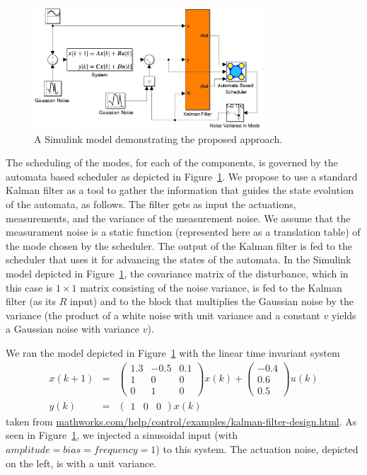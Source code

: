 \documentclass{sig-alternate-ipsn13}
\begin{document}
\begin{figure}%
	\centerline{\includegraphics[width=85mm]{SimulinkModel.jpg}}
	\caption{A Simulink model demonstrating the proposed approach.}
	\label{fig:simulink}
\end{figure}

The scheduling of the modes, for each of the components, is governed by the automata based scheduler as depicted in Figure~\ref{fig:simulink}. We propose to use a standard Kalman filter as a tool to gather the information that guides the state evolution of the automata, as follows. The filter gets as input the actuations,  measurements, and the variance of the measurement noise. We assume that the measurament noise is a static function (represented here as a translation table) of the mode chosen by the scheduler. The output of the Kalman filter is fed to the scheduler that uses it for advancing the states of the automata. In the Simulink model depicted in Figure~\ref{fig:simulink}, the covariance matrix of the disturbance, which in this case is $1 \times 1$ matrix consisting of the noise variance, is fed to the Kalman filter (as its $R$ input) and to the block that multiplies the Gaussian noise by the variance (the product of a white noise with unit variance and a constant $v$ yields a Gaussian noise with variance $v$).

We ran the model depicted in Figure~\ref{fig:simulink} with the linear time invariant system
\begin{eqnarray*}
x(k+1) &=& \begin{pmatrix}
	1.3  & -0.5  & 0.1 \\
	1    & 0     & 0 \\
	0    & 1     & 0
\end{pmatrix}x(k)+ 
\begin{pmatrix}
-0.4 \\
0.6\\
0.5\end{pmatrix} u(k) \\
y(k)&=& \begin{pmatrix}1 & 0 &0\end{pmatrix}x(k)
\end{eqnarray*}
taken from \url{mathworks.com/help/control/examples/kalman-filter-design.html}. As seen in Figure~\ref{fig:simulink}, we injected a sinusoidal input (with $amplitude=bias=frequency=1$) to this system. 
The actuation noise, depicted on the left, is with a unit variance. 
\end{document}
